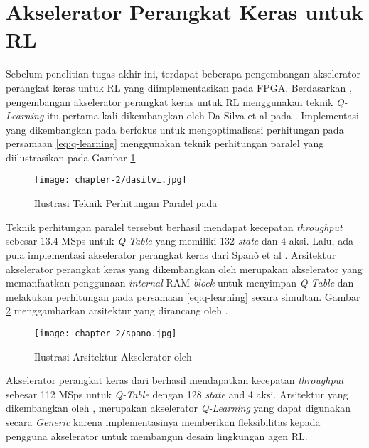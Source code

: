 \section{Akselerator Perangkat Keras untuk \acl{RL}}

Sebelum penelitian tugas akhir ini, terdapat beberapa pengembangan akselerator perangkat keras untuk \ac{RL} yang diimplementasikan pada \ac{FPGA}. Berdasarkan \parencite{sutisna2023faraneq}, pengembangan akselerator perangkat keras untuk \ac{RL} menggunakan teknik \textit{Q-Learning} itu pertama kali dikembangkan oleh Da Silva et al pada \parencite{dasilva2019parallel}. Implementasi yang dikembangkan pada \parencite{dasilva2019parallel} berfokus untuk mengoptimalisasi perhitungan pada persamaan \ref{eq:q-learning} menggunakan teknik perhitungan paralel yang diilustrasikan pada Gambar \ref{fig:ilustrasi-dasilvi}.

\begin{figure}[h]
	\centering
	\texttt{[image: chapter-2/dasilvi.jpg]}
	\caption{Ilustrasi Teknik Perhitungan Paralel pada \parencite{dasilva2019parallel}}
	\label{fig:ilustrasi-dasilvi}
\end{figure}

Teknik perhitungan paralel tersebut berhasil mendapat kecepatan \textit{throughput} sebesar 13.4  \ac{MSps} untuk \textit{Q-Table} yang memiliki 132 \textit{state} dan 4 aksi. Lalu, ada pula implementasi akselerator perangkat keras dari Spanò et al \parencite{spano2019efficient}. Arsitektur akselerator perangkat keras yang dikembangkan oleh \parencite{spano2019efficient} merupakan akselerator yang memanfaatkan penggunaan \textit{internal} \ac{RAM} \textit{block} untuk menyimpan \textit{Q-Table} dan melakukan perhitungan pada persamaan \ref{eq:q-learning} secara simultan. Gambar \ref{fig:ilustrasi-spano} menggambarkan arsitektur yang dirancang oleh \parencite{spano2019efficient}.

\begin{figure}[h]
	\centering
	\texttt{[image: chapter-2/spano.jpg]}
	\caption{Ilustrasi Arsitektur Akselerator oleh \parencite{spano2019efficient}}
	\label{fig:ilustrasi-spano}
\end{figure}

Akselerator perangkat keras dari \parencite{spano2019efficient} berhasil mendapatkan kecepatan \textit{throughput} sebesar 112 MSps untuk \textit{Q-Table} dengan 128 \textit{state} and 4 aksi. Arsitektur yang dikembangkan oleh \parencite{spano2019efficient}, merupakan akselerator \textit{Q-Learning} yang dapat digunakan secara \textit{Generic} karena implementasinya memberikan fleksibilitas kepada pengguna akselerator untuk membangun desain lingkungan agen \ac{RL}.

